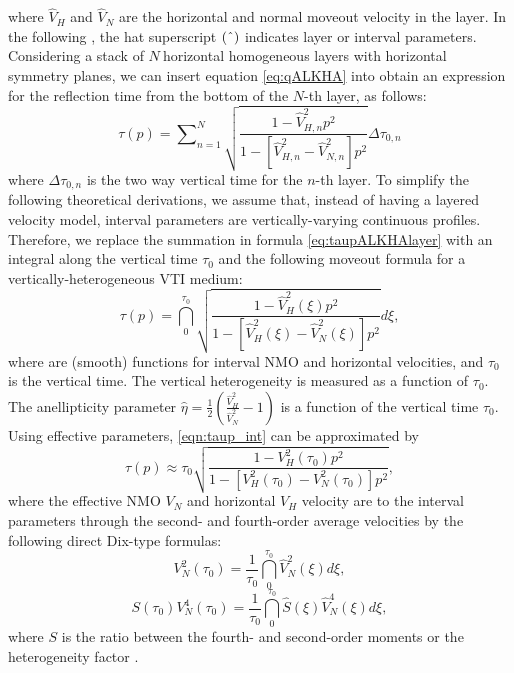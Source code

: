 where $\hat{V}_{H}$ and $\hat{V}_{N}$ are the horizontal and normal
moveout velocity in the layer. In the following , the
hat superscript $(\symbol{94})$ indicates layer or interval
parameters. Considering a stack of $N\ $horizontal homogeneous layers
with horizontal symmetry planes, we can insert equation
\ref{eq:qALKHA} into    obtain an
expression for the \taup reflection time from the bottom of the $N$-th
layer, as follows:
\begin{equation}
\tau
(p)=\sum\nolimits_{n=1}^{N}\sqrt{\dfrac{1-\hat{V}_{H,n}^{2}p^{2}}{1-[\hat{V}_{H,n}^{2}-\hat{V}_{N,n}^{2}]p^{2}}}\Delta
\tau _{0,n}
\label{eq:taupALKHAlayer}
\end{equation}
where $\Delta \tau _{0,n}$ is the two way vertical time for the $n$-th
layer.  To simplify the following theoretical derivations, we assume
that, instead of having a layered velocity model, interval parameters
are vertically-varying continuous profiles. Therefore, we replace the
summation in formula \ref{eq:taupALKHAlayer} with an integral along
the vertical time $\tau _{0}$ and   the
following \taup moveout formula for a vertically-heterogeneous VTI
medium:
\begin{equation}
\tau (p)=\dint\limits_{0}^{\tau _{0}}\sqrt{ \dfrac{1-\hat{V}_{H}^{2}(\xi
)p^{2} } {1-[\hat{V}_{H}^{2}(\xi )-\hat{V}_{N}^{2}(\xi )]p^{2}}}d\xi ,
\label{eqn:taup_int}
\end{equation}
where 
 are (smooth) functions for interval
NMO and horizontal velocities, and $\tau _{0}$ is the vertical
time. The vertical heterogeneity is measured as a function of $\tau
_{0}$. The anellipticity parameter $\hat{\eta}=\frac{1}{2}\left(
\frac{\hat{V}^2_{H}}{\hat{V}^2_{N}}-1\right)$ is  a function
of the vertical time $\tau _{0}$. Using effective parameters,   \ref{eqn:taup_int} can be 
approximated by
\begin{equation}
\tau (p)\approx \tau _{0}\sqrt{\dfrac{1-V_{H}^{2}(\tau
_{0})p^{2}}{1-[V_{H}^{2}(\tau _{0})-V_{N}^{2}(\tau _{0})]p^{2}}},
\label{eqn:taup_effective}
\end{equation}
where the effective NMO $V_{N}$ and horizontal $V_{H}$ velocity are
  to the interval parameters through the second- and
fourth-order average velocities \citep{taner:859,ursin:D23} by the
following direct Dix-type formulas:
\begin{equation}
V_{N}^{2}(\tau _{0})=\dfrac{1}{\tau _{0}}\dint\limits_{0}^{\tau
_{0}}\hat{V}_{N}^{2}(\xi )d\xi , \label{eqn:2ndmoment}
\end{equation}
\begin{equation}
S(\tau _{0})V_{N}^{4}(\tau _{0})=\dfrac{1}{\tau _{0}}\dint\limits_{0}^{\tau
_{0}}{}\hat{S}(\xi )\hat{V}_{N}^{4}(\xi )d\xi ,  \label{eqn:4thmoment}
\end{equation}
where $S$ is the ratio between the fourth- and second-order
moments or the heterogeneity factor \citep{bazelaire:143,alkhalifah:1839,siliqi:2245}. 

